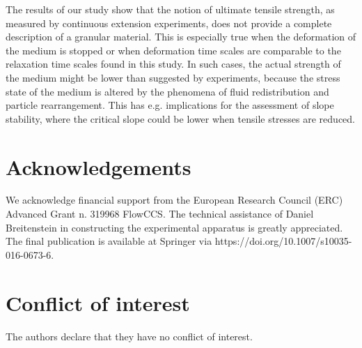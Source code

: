 The results of our study show that the notion of ultimate tensile strength, as measured by continuous extension experiments, does not provide a complete description of a granular material. This is especially true when the deformation of the medium is stopped or when deformation time scales are comparable to the relaxation time scales found in this study. In such cases, the actual strength of the medium might be lower than suggested by experiments, because the stress state of the medium is altered by the phenomena of fluid redistribution and particle rearrangement. This has e.g. implications for the assessment of slope stability, where the critical slope could be lower when tensile stresses are reduced.

\section*{Acknowledgements}
\label{sec:Conclusions}

We acknowledge financial support from the European Research Council (ERC) Advanced Grant n. 319968 FlowCCS. The technical assistance of Daniel Breitenstein in constructing the experimental apparatus is greatly appreciated. The final publication is available at Springer via https://doi.org/10.1007/s10035-016-0673-6.

\section*{Conflict of interest}
\label{sec:Conflict of interest}

The authors declare that they have no conflict of interest.


%


